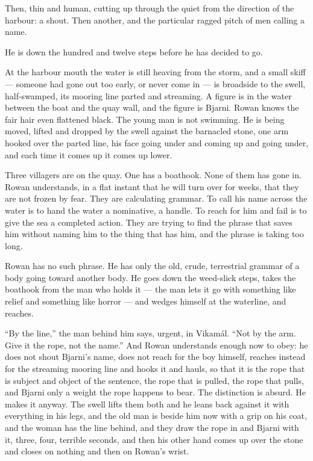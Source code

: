 \documentclass[11pt,oneside]{book}
\newcommand{\sceneline}{%
  \par\vspace{1.2em}
  \begin{center}
    \fontsize{11}{11}\selectfont \textbullet\quad\textbullet\quad\textbullet
  \end{center}
  \vspace{0.6em}\noindent\ignorespaces
}
\begin{document}
Then, thin and human, cutting up through the quiet from the direction of
the harbour: a shout. Then another, and the particular ragged pitch of
men calling a name.

\sceneline

He is down the hundred and twelve steps before he has decided to go.

At the harbour mouth the water is still heaving from the storm, and a
small skiff --- someone had gone out too early, or never come in --- is
broadside to the swell, half-swamped, its mooring line parted and
streaming. A figure is in the water between the boat and the quay wall,
and the figure is Bjarni. Rowan knows the fair hair even flattened
black. The young man is not swimming. He is being moved, lifted and
dropped by the swell against the barnacled stone, one arm hooked over
the parted line, his face going under and coming up and going under, and
each time it comes up it comes up lower.

Three villagers are on the quay. One has a boathook. None of them has
gone in. Rowan understands, in a flat instant that he will turn over for
weeks, that they are not frozen by fear. They are calculating grammar.
To call his name across the water is to hand the water a nominative, a
handle. To reach for him and fail is to give the sea a completed action.
They are trying to find the phrase that saves him without naming him to
the thing that has him, and the phrase is taking too long.

Rowan has no such phrase. He has only the old, crude, terrestrial
grammar of a body going toward another body. He goes down the weed-slick
steps, takes the boathook from the man who holds it --- the man lets it
go with something like relief and something like horror --- and wedges
himself at the waterline, and reaches.

``By the line,'' the man behind him says, urgent, in Vikamál. ``Not by
the arm. Give it the rope, not the name.'' And Rowan understands enough
now to obey: he does not shout Bjarni's name, does not reach for the boy
himself, reaches instead for the streaming mooring line and hooks it and
hauls, so that it is the rope that is subject and object of the
sentence, the rope that is pulled, the rope that pulls, and Bjarni only
a weight the rope happens to bear. The distinction is absurd. He makes
it anyway. The swell lifts them both and he leans back against it with
everything in his legs, and the old man is beside him now with a grip on
his coat, and the woman has the line behind, and they draw the rope in
and Bjarni with it, three, four, terrible seconds, and then his other
hand comes up over the stone and closes on nothing and then on Rowan's
wrist.
\end{document}
